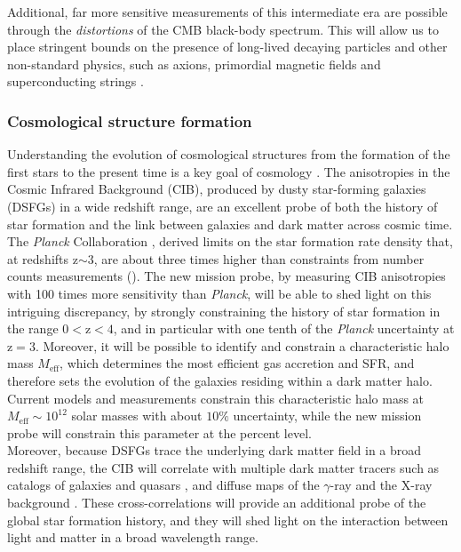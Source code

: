 Additional, far more sensitive measurements of this intermediate era are possible through the {\it distortions} of the CMB black-body spectrum. This will allow us to place stringent bounds on the presence of long-lived decaying particles \citep{Hu1993b, Chluba2013fore, Chluba2013PCA, Dimastrogiovanni2015} and other non-standard 
physics, such as axions, primordial magnetic fields and superconducting strings \citep[e.g.,][]{Jedamzik2000, Tashiro2012, Dolgov2013, Tashiro2013, Caldwell2013}.

\vspace{-0.15in}
\subsubsection{Cosmological structure formation}
\vspace{-0.05in}
Understanding the evolution of cosmological structures from the formation of the
first stars to the present time is a key goal of cosmology \citep{dunlop2011}.
The anisotropies in the Cosmic Infrared Background (CIB), produced by
dusty star-forming galaxies (DSFGs) in a wide redshift range, are
an excellent probe of both the history of star formation and the link between
galaxies and dark matter across cosmic time. The {\it Planck} Collaboration \citep{planck2014-XXX,planckXVIII},
derived limits on the star formation rate density that,
at redshifts z$\mathrm{\sim3}$, are about three times higher
than constraints from number counts measurements (\cite{madau2014}).
The new mission probe, by measuring CIB anisotropies with 100 times more
sensitivity than {\it Planck}, will be able to shed light on this intriguing
discrepancy, by strongly constraining the history of star formation
in the range $\mathrm{0<z<4}$, and in particular with one tenth of the {\it Planck} uncertainty
at z$\mathrm{=3}$. Moreover, it will be possible to identify and constrain a
characteristic halo mass $M_{\mathrm{eff}}$,
which determines the most efficient gas accretion and SFR, and
therefore sets the evolution of the galaxies residing within
a dark matter halo. Current models and measurements
constrain this characteristic halo mass at
$M_{\mathrm{eff}}\sim 10^{12}$ solar masses with about $\mathrm{10\%}$
uncertainty, while the new mission probe will
constrain this parameter at the percent level.\\
Moreover, because DSFGs trace the underlying dark matter
field in a broad redshift range, the CIB will
correlate with multiple dark matter
tracers such as catalogs of galaxies and quasars
\citep{serra2014,wang2015},
and diffuse maps of the $\gamma$-ray and
the X-ray background \citep{cooray2016}.
These cross-correlations will provide an additional probe of the
global star formation history, and they
will shed light on the interaction between light and matter
in a broad wavelength range.


